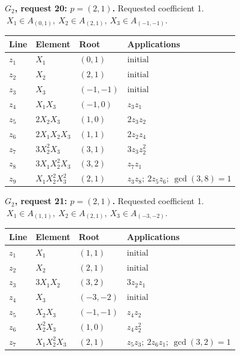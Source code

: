\par\medskip\noindent\begin{minipage}{\textwidth}
\textbf{\(G_2\), request 20: \(p=(2,1)\).} Requested coefficient 1.
\(\ X_1\in A_{(0,1)},\ X_2\in A_{(2,1)},\ X_3\in A_{(-1,-1)}.\)\par
\smallskip\centering\small\begin{tabular}{@{}llll@{}}\toprule
Line & Element & Root & Applications\\\midrule
\(z_{1}\) & \(X_1\) & \((0,1)\) & \(\text{initial}\) \\
\(z_{2}\) & \(X_2\) & \((2,1)\) & \(\text{initial}\) \\
\(z_{3}\) & \(X_3\) & \((-1,-1)\) & \(\text{initial}\) \\
\(z_{4}\) & \(X_1X_3\) & \((-1,0)\) & \(z_{3}z_{1}\) \\
\(z_{5}\) & \(2X_2X_3\) & \((1,0)\) & \(2z_{3}z_{2}\) \\
\(z_{6}\) & \(2X_1X_2X_3\) & \((1,1)\) & \(2z_{2}z_{4}\) \\
\(z_{7}\) & \(3X_2^{2}X_3\) & \((3,1)\) & \(3z_{3}z_{2}^{2}\) \\
\(z_{8}\) & \(3X_1X_2^{2}X_3\) & \((3,2)\) & \(z_{7}z_{1}\) \\
\(z_{9}\) & \(X_1X_2^{2}X_3^{2}\) & \((2,1)\) & \(z_{3}z_{8};\ 2z_{5}z_{6};\ \gcd(3,8)=1\) \\
\bottomrule\end{tabular}\end{minipage}\par
\par\medskip\noindent\begin{minipage}{\textwidth}
\textbf{\(G_2\), request 21: \(p=(2,1)\).} Requested coefficient 1.
\(\ X_1\in A_{(1,1)},\ X_2\in A_{(2,1)},\ X_3\in A_{(-3,-2)}.\)\par
\smallskip\centering\small\begin{tabular}{@{}llll@{}}\toprule
Line & Element & Root & Applications\\\midrule
\(z_{1}\) & \(X_1\) & \((1,1)\) & \(\text{initial}\) \\
\(z_{2}\) & \(X_2\) & \((2,1)\) & \(\text{initial}\) \\
\(z_{3}\) & \(3X_1X_2\) & \((3,2)\) & \(3z_{2}z_{1}\) \\
\(z_{4}\) & \(X_3\) & \((-3,-2)\) & \(\text{initial}\) \\
\(z_{5}\) & \(X_2X_3\) & \((-1,-1)\) & \(z_{4}z_{2}\) \\
\(z_{6}\) & \(X_2^{2}X_3\) & \((1,0)\) & \(z_{4}z_{2}^{2}\) \\
\(z_{7}\) & \(X_1X_2^{2}X_3\) & \((2,1)\) & \(z_{5}z_{3};\ 2z_{6}z_{1};\ \gcd(3,2)=1\) \\
\bottomrule\end{tabular}\end{minipage}\par
